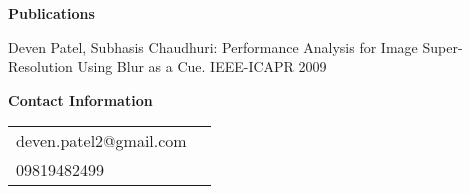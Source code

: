 \documentclass[a4paper,12pt]{article}
\begin{document}
\colorbox{titleColor}{\parbox{6.7in}{\textbf{Publications}}}
\begin{description}
\item   Deven Patel, Subhasis Chaudhuri: Performance Analysis for Image Super-Resolution Using Blur as a Cue. IEEE-ICAPR 2009
\end{description}
\bigskip


\colorbox{titleColor}{\parbox{6.7in}{\textbf{ Contact Information}}}
\begin{description}
\item 
\begin{tabular}{ll}%
 deven.patel2@gmail.com \\
 09819482499
\end{tabular}
\end{description}
\end{document}
